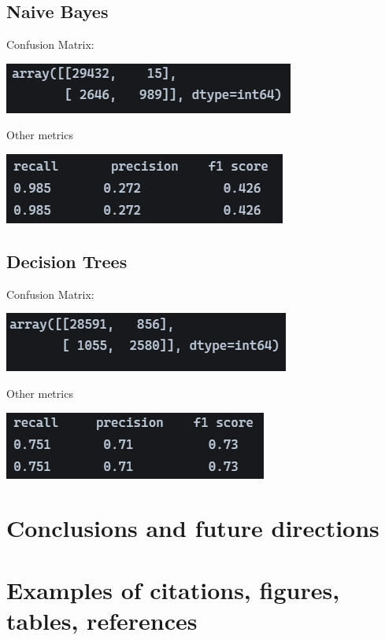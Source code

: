 \documentclass[11pt]{article}
\begin{document}
\subsection{Naive Bayes}
Confusion Matrix:
\begin{center}
	\includegraphics[scale=0.75]{figs/conf_NB.png}
\end{center}
Other metrics
\begin{center}
	\includegraphics[scale=0.75]{figs/rpf_NBB.png}	
\end{center}

\subsection{Decision Trees}
Confusion Matrix:
\begin{center}
	\includegraphics[scale=0.75]{figs/conf_DT.png}
\end{center}
Other metrics
\begin{center}
	\includegraphics[scale=0.75]{figs/rpf_DT.png}	
\end{center}

\section{Conclusions and future directions}
\section{Examples of citations, figures, tables, references}
\label{sec:others}
\end{document}
